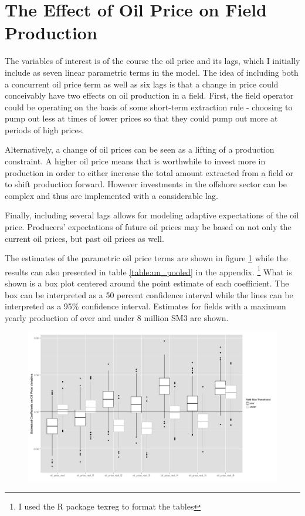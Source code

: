 \documentclass[12pt]{article}
\begin{document}
\section{The Effect of Oil Price on Field Production}

The variables of interest is of the course the oil price and its lags, which I initially include as seven linear parametric terms in the model.  The idea of including both a concurrent oil price term as well as six lags is that a change in price could conceivably have two effects on oil production in a field.  First, the field operator could be operating on the basis of some short-term extraction rule - choosing to pump out less at times of lower prices so that they could pump out more at periods of high prices.  

Alternatively, a change of oil prices can be seen as a lifting of a production constraint.  A higher oil price means that is worthwhile to invest more in production in order to either increase the total amount extracted from a field or to shift production forward.  However investments in the offshore sector can be complex and thus are implemented with a considerable lag.  

Finally, including several lags allows for modeling adaptive expectations of the oil price.  Producers' expectations of future oil prices may be based on not only the current oil prices, but past oil prices as well.  

The estimates of the parametric oil price terms are shown in figure \ref{gam_price_dirty_box} while the results can also presented in table \ref{table:un_pooled} in the appendix. \footnote{I used the R package texreg \citep{leifeld_texreg:_2013} to format the tables} What is shown is a box plot centered around the point estimate of each coefficient.  The box can be interpreted as a 50 percent confidence interval while the lines can be interpreted as a 95\% confidence interval.  Estimates for fields with a maximum yearly production of over and under 8 million SM3 are shown.  

\begin{figure}
	\includegraphics[width=1\textwidth]{figures/gam_price_6_print.png}
	\caption{}
	\label{gam_price_dirty_box}
\end{figure}
\end{document}
